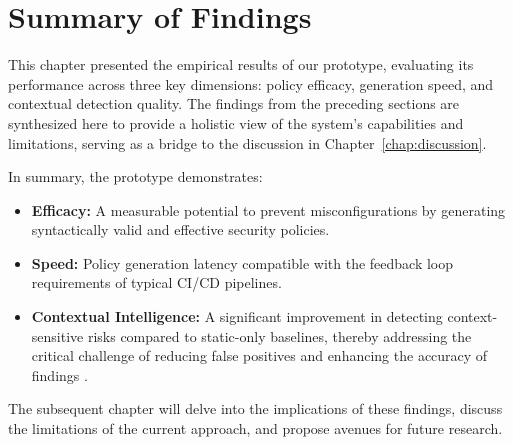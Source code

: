 
\section{Summary of Findings}\label{sec:summary-findings}

This chapter presented the empirical results of our prototype, evaluating its performance across three key dimensions: policy efficacy, generation speed, and contextual detection quality. The findings from the preceding sections are synthesized here to provide a holistic view of the system's capabilities and limitations, serving as a bridge to the discussion in Chapter~\ref{chap:discussion}.

In summary, the prototype demonstrates:
\begin{itemize}
    \item \textbf{Efficacy:} A measurable potential to prevent misconfigurations by generating syntactically valid and effective security policies.
    \item \textbf{Speed:} Policy generation latency compatible with the feedback loop requirements of typical CI/CD pipelines.
    \item \textbf{Contextual Intelligence:} A significant improvement in detecting context-sensitive risks compared to static-only baselines, thereby addressing the critical challenge of reducing false positives and enhancing the accuracy of findings \cite{zheng_context-aware_2023}.
\end{itemize}

The subsequent chapter will delve into the implications of these findings, discuss the limitations of the current approach, and propose avenues for future research.